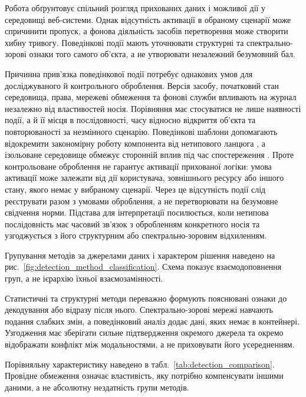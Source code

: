 Робота \cite{iglesias2023driveby} обґрунтовує спільний розгляд прихованих даних і можливої дії у середовищі веб-системи. Однак відсутність активації в обраному сценарії може спричинити пропуск, а фонова діяльність засобів перетворення може створити хибну тривогу. Поведінкові події мають уточнювати структурні та спектрально-зорові ознаки того самого об’єкта, а не утворювати незалежний безумовний бал.

Причинна прив’язка поведінкової події потребує однакових умов для досліджуваного й контрольного оброблення. Версія засобу, початковий стан середовища, права, мережеві обмеження та фонові служби впливають на журнал незалежно від властивостей носія. Порівняння має стосуватися не лише наявності події, а й її місця в послідовності, часу відносно відкриття об’єкта та повторюваності за незмінного сценарію. Поведінкові шаблони допомагають відокремити закономірну роботу компонента від нетипового ланцюга \cite{denysiuk2024behavior}, а ізольоване середовище обмежує сторонній вплив під час спостереження \cite{abbadini2023sandboxing}. Проте контрольоване оброблення не гарантує активації прихованої логіки: умова активації може залежати від дії користувача, зовнішнього ресурсу або іншого стану, якого немає у вибраному сценарії. Через це відсутність події слід реєструвати разом з умовами оброблення, а не перетворювати на безумовне свідчення норми. Підстава для інтерпретації посилюється, коли нетипова послідовність має часовий зв’язок з обробленням конкретного носія та узгоджується з його структурним або спектрально-зоровим відхиленням.

Групування методів за джерелами даних і характером рішення наведено на рис.~\ref{fig:detection_method_classification}. Схема показує взаємодоповнення груп, а не ієрархію їхньої взаємозамінності.



Статистичні та структурні методи переважно формують пояснювані ознаки до декодування або відразу після нього. Спектрально-зорові мережі навчають подання слабких змін, а поведінковий аналіз додає дані, яких немає в контейнері. Узгодження має зберігати сильне підтвердження окремого джерела та окремо відображати конфлікт між модальностями, а не приховувати його усередненням.

Порівняльну характеристику наведено в табл.~\ref{tab:detection_comparison}. Провідне обмеження означає властивість, яку потрібно компенсувати іншими даними, а не абсолютну нездатність групи методів.

